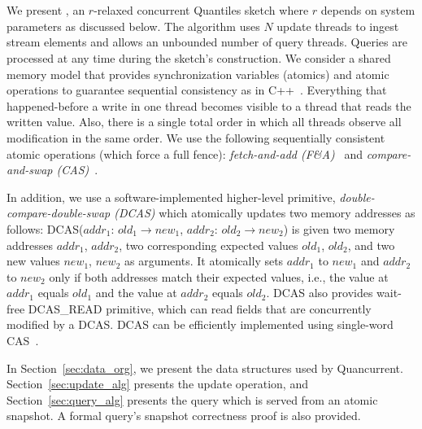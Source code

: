 \chapter{\mysketch}
\label{chap:quancurrent}

We present \mysketch, an $r$-relaxed concurrent Quantiles sketch where $r$ depends on system parameters as discussed below. The algorithm uses $N$ update threads to ingest stream elements and allows an unbounded number of query threads. Queries are processed at any time during the sketch's construction. 
We consider a shared memory model that provides synchronization variables (atomics) and atomic operations to guarantee sequential consistency as in C++~\cite{Boehm_2008_cpp}. Everything that happened-before a write in one thread becomes visible to a thread that reads the written value. Also, there is a single total order in which all threads observe all modification in the same order. 
We use the following sequentially consistent atomic operations (which force a full fence): \emph{fetch-and-add (F\&A)}~\cite{x86-faa} and \emph{compare-and-swap (CAS)}~\cite{x86-cas}. 

In addition, we use a software-implemented higher-level primitive, \emph{double-compare-double-swap (DCAS)} which atomically updates two memory addresses as follows: DCAS($addr_1$: $old_1 \to new_1$, $addr_2$: $old_2 \to new_2$)
is given two memory addresses $addr_1$, $addr_2$, two corresponding expected values $old_1$, $old_2$, and two new values $new_1$, $new_2$ as arguments. It atomically sets $addr_1$ to $new_1$ and $addr_2$ to $new_2$ only if both addresses match their expected values, i.e., the value at $addr_1$ equals $old_1$ and the value at $addr_2$ equals $old_2$. DCAS also provides wait-free DCAS\_READ primitive, which can read fields that are concurrently modified by a DCAS. DCAS can be efficiently implemented using single-word CAS~\cite{Harris2002practical,guerraoui2020efficient}. 


In Section~\ref{sec:data_org}, we present the data structures used by Quancurrent. Section~\ref{sec:update_alg} presents the update operation, and Section~\ref{sec:query_alg} presents the query which is served from an atomic snapshot. A formal query's snapshot correctness proof is also provided.  


